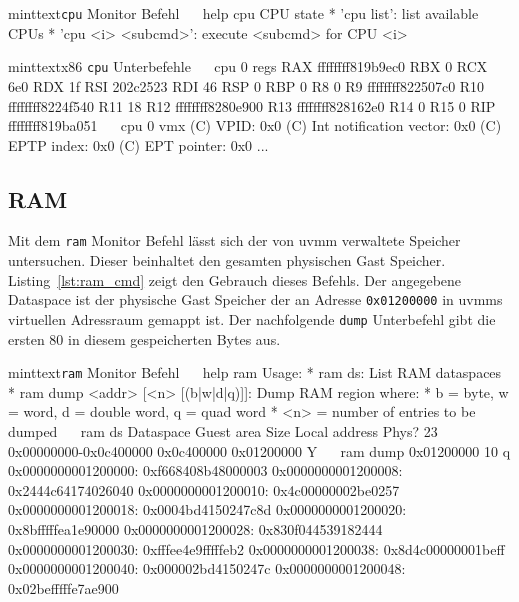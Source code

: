 \begin{mintlisting}[label=lst:cpu_array_cmd]{minttext}{\texttt{cpu} Monitor Befehl}
~\color{red}{monitor>}~ help cpu
CPU state
* 'cpu list': list available CPUs
* 'cpu <i> <subcmd>': execute <subcmd> for CPU <i>
\end{mintlisting}

\begin{mintlisting}[label=lst:cpu_cmd]{minttext}{x86 \texttt{cpu} Unterbefehle}
~\color{red}{monitor>}~ cpu 0 regs
RAX ffffffff819b9ec0
RBX 0
RCX 6e0
RDX 1f
RSI 202c2523
RDI 46
RSP 0
RBP 0
R8 0
R9 ffffffff822507c0
R10 ffffffff8224f540
R11 18
R12 ffffffff8280e900
R13 ffffffff828162e0
R14 0
R15 0
RIP ffffffff819ba051
~\color{red}{monitor>}~ cpu 0 vmx
(C) VPID: 0x0
(C) Int notification vector: 0x0
(C) EPTP index: 0x0
(C) EPT pointer: 0x0
...
\end{mintlisting}

\subsection{RAM}

Mit dem \texttt{ram} Monitor Befehl lässt sich der von uvmm verwaltete Speicher
untersuchen. Dieser beinhaltet den gesamten physischen Gast Speicher.
Listing~\ref{lst:ram_cmd} zeigt den Gebrauch dieses Befehls. Der angegebene
Dataspace ist der physische Gast Speicher der an Adresse \texttt{0x01200000} in
uvmms virtuellen Adressraum gemappt ist. Der nachfolgende \texttt{dump}
Unterbefehl gibt die ersten 80 in diesem gespeicherten Bytes aus.

\begin{mintlisting}[label=lst:ram_cmd]{minttext}{\texttt{ram} Monitor Befehl}
~\color{red}{monitor>}~ help ram
Usage:
* ram ds: List RAM dataspaces
* ram dump <addr> [<n> [(b|w|d|q)]]: Dump RAM region
where: * b = byte, w = word, d = double word, q = quad word
       * <n> = number of entries to be dumped
~\color{red}{monitor>}~ ram ds
Dataspace  Guest area             Size        Local address  Phys?
       23  0x00000000-0x0c400000  0x0c400000  0x01200000     Y
~\color{red}{monitor>}~ ram dump 0x01200000 10 q
0x0000000001200000: 0xf668408b48000003
0x0000000001200008: 0x2444c64174026040
0x0000000001200010: 0x4c00000002be0257
0x0000000001200018: 0x0004bd4150247c8d
0x0000000001200020: 0x8bfffffea1e90000
0x0000000001200028: 0x830f044539182444
0x0000000001200030: 0xfffee4e9fffffeb2
0x0000000001200038: 0x8d4c00000001beff
0x0000000001200040: 0x000002bd4150247c
0x0000000001200048: 0x02befffffe7ae900
\end{mintlisting}


